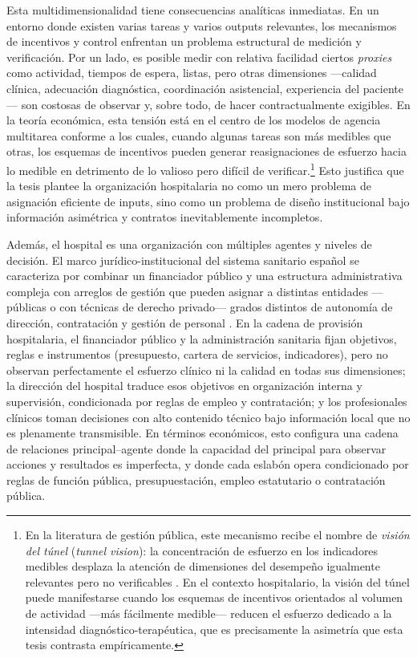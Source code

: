 Esta multidimensionalidad tiene consecuencias analíticas inmediatas. En un entorno donde existen varias tareas y varios outputs relevantes, los mecanismos de incentivos y control enfrentan un problema estructural de medición y verificación. Por un lado, es posible medir con relativa facilidad ciertos \textit{proxies}  como actividad, tiempos de espera, listas, pero otras dimensiones ---calidad clínica, adecuación diagnóstica, coordinación asistencial, experiencia del paciente--- son costosas de observar y, sobre todo, de hacer contractualmente exigibles. En la teoría económica, esta tensión está en el centro de los modelos 
de agencia multitarea \citep{holmstrom1991} conforme a los cuales, 
cuando algunas tareas son más medibles que otras, los esquemas de 
incentivos pueden generar reasignaciones de esfuerzo hacia lo medible 
en detrimento de lo valioso pero difícil de verificar.\footnote{En la 
literatura de gestión pública, este mecanismo recibe el nombre de 
\textit{visión del túnel} (\textit{tunnel vision}): la concentración 
de esfuerzo en los indicadores medibles desplaza la atención de 
dimensiones del desempeño igualmente relevantes pero no verificables 
\citep{smith1995}. En el contexto hospitalario, la visión del túnel 
puede manifestarse cuando los esquemas de incentivos orientados al 
volumen de actividad ---más fácilmente medible--- reducen el esfuerzo 
dedicado a la intensidad diagnóstico-terapéutica, que es precisamente 
la asimetría que esta tesis contrasta empíricamente.} Esto justifica que la tesis plantee la organización hospitalaria no como un mero problema de asignación eficiente de inputs, sino como un problema de diseño institucional bajo información asimétrica y contratos inevitablemente incompletos.

Además, el hospital es una organización con múltiples agentes y niveles de decisión. El marco jurídico-institucional del sistema sanitario español se caracteriza por combinar un financiador público y una estructura administrativa compleja con arreglos de gestión que pueden asignar a distintas entidades ---públicas o con técnicas de derecho privado--- grados distintos de autonomía de dirección, contratación y gestión de personal \citep{dominguez2006}. En la cadena de provisión hospitalaria, el financiador público y la administración sanitaria fijan objetivos, reglas e instrumentos (presupuesto, cartera de servicios, indicadores), pero no observan perfectamente el esfuerzo clínico ni la calidad en todas sus dimensiones; la dirección del hospital traduce esos objetivos en organización interna y supervisión, condicionada por reglas de empleo y contratación; y los profesionales clínicos toman decisiones con alto contenido técnico bajo información local que no es plenamente transmisible. En términos económicos, esto configura una cadena de relaciones principal--agente donde la capacidad del principal para observar acciones y resultados es imperfecta, y donde cada eslabón opera condicionado por reglas de función pública, presupuestación, empleo estatutario o contratación pública.

